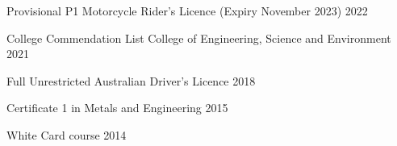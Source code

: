 
\begin{cvhonors}

  \cvhonor
    {Provisional P1 Motorcycle Rider's Licence} %
    {(Expiry November 2023)} %
    {} %
    {2022} %

  \cvhonor
    {College Commendation List} %
    {College of Engineering, Science and Environment} %
    {} %
    {2021} %

  \cvhonor
    {Full Unrestricted Australian Driver’s Licence} %
    {} %
    {} %
    {2018} %

    
  \cvhonor
    {Certificate 1 in Metals and Engineering} %
    {} %
    {} %
    {2015} %


  \cvhonor
    {White Card course} %
    {} %
    {} %
    {2014} %

\end{cvhonors}
